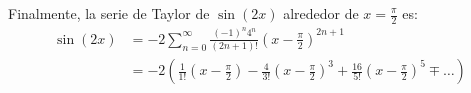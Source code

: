 \documentclass{article}
\begin{document}
Finalmente, la serie de Taylor de $\sin(2x)$ alrededor de $x = \frac{\pi}{2}$ es:
\begin{align*}
\sin(2x) &= -2 \sum_{n=0}^{\infty} \frac{(-1)^n 4^n}{(2n+1)!} \left(x - \frac{\pi}{2}\right)^{2n+1} \\
&= -2 \left( \frac{1}{1!} \left(x - \frac{\pi}{2}\right) - \frac{4}{3!} \left(x - \frac{\pi}{2}\right)^3 + \frac{16}{5!} \left(x - \frac{\pi}{2}\right)^5 \mp \ldots \right)
\end{align*}
\end{document}
